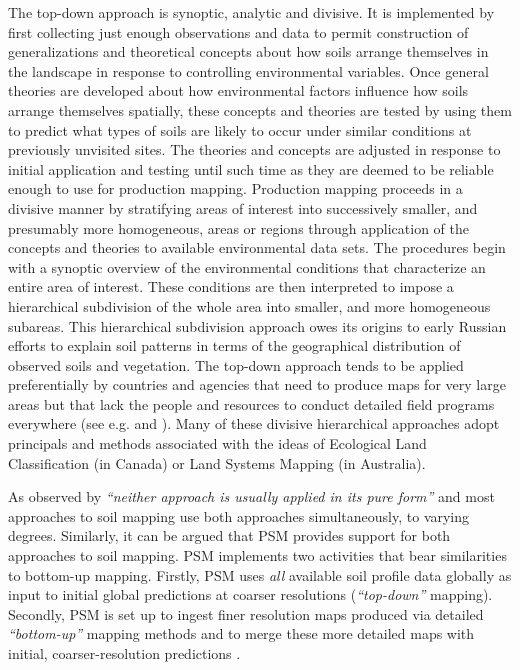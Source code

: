 \documentclass[11pt]{krantz}
\theoremstyle{definition}
\theoremstyle{definition}
\theoremstyle{definition}
\theoremstyle{remark}
\begin{document}
The top-down approach is synoptic, analytic and divisive. It is
implemented by first collecting just enough observations and data to
permit construction of generalizations and theoretical concepts about
how soils arrange themselves in the landscape in response to controlling
environmental variables. Once general theories are developed about how
environmental factors influence how soils arrange themselves spatially,
these concepts and theories are tested by using them to predict what
types of soils are likely to occur under similar conditions at
previously unvisited sites. The theories and concepts are adjusted in
response to initial application and testing until such time as they are
deemed to be reliable enough to use for production mapping. Production
mapping proceeds in a divisive manner by stratifying areas of interest
into successively smaller, and presumably more homogeneous, areas or
regions through application of the concepts and theories to available
environmental data sets. The procedures begin with a synoptic overview
of the environmental conditions that characterize an entire area of
interest. These conditions are then interpreted to impose a hierarchical
subdivision of the whole area into smaller, and more homogeneous
subareas. This hierarchical subdivision approach owes its origins to
early Russian efforts to explain soil patterns in terms of the
geographical distribution of observed soils and vegetation. The top-down
approach tends to be applied preferentially by countries and agencies
that need to produce maps for very large areas but that lack the people
and resources to conduct detailed field programs everywhere (see e.g.
\citet{Henderson2004Geoderma} and \citet{Mansuy201459}). Many of these
divisive hierarchical approaches adopt principals and methods associated
with the ideas of Ecological Land Classification
\citep{rowe1981ecological} (in Canada) or Land Systems Mapping
\citep{gibbons1964study, rowan1990land} (in Australia).

As observed by \citet{Rossiter2001} \emph{``neither approach is usually
applied in its pure form''} and most approaches to soil mapping use both
approaches simultaneously, to varying degrees. Similarly, it can be
argued that PSM provides support for both approaches to soil mapping.
PSM implements two activities that bear similarities to bottom-up
mapping. Firstly, PSM uses \emph{all} available soil profile data
globally as input to initial global predictions at coarser resolutions
(\emph{``top-down''} mapping). Secondly, PSM is set up to ingest finer
resolution maps produced via detailed \emph{``bottom-up''} mapping
methods and to merge these more detailed maps with initial,
coarser-resolution predictions \citep{ramcharan2018soil}.
\end{document}
